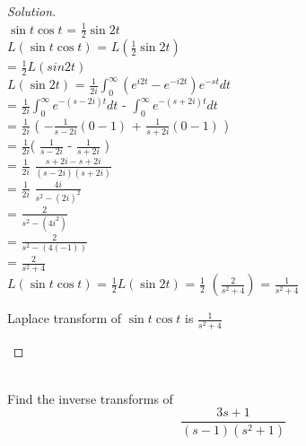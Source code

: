 \documentclass[12pt]{article}
\newenvironment{problem}[2][Problem]{\begin{trivlist}
\item[\hskip \labelsep {\bfseries #1}\hskip \labelsep {\bfseries #2.}]}{\end{trivlist}}
\begin{document}
\begin{proof}[Solution]
\text{ }\\
$\sin{t} \cos{t} $ = $\frac{1}{2} \sin{2t} $ \\

$L(\sin{t} \cos{t})$  =  $L(\frac{1}{2} \sin{2t} )$ \\

                          = $\frac{1}{2} L(sin{2t}) $ \\
                          
$L(\sin{2t})$  =  $\frac{1}{2i}\int_{0}^{\infty} (e^{i2t} - e^{-i2t}) e^{-st} dt $  \\

                   =  $\frac{1}{2i}\int_{0}^{\infty} e^{-(s-2i)t} dt$  -  $\int_{0}^{\infty} e^{-(s+2i)t} dt$  \\
                   
                   = $\frac{1}{2i}$ ( $-\frac{1}{s-2i}  (0-1)$  +  $\frac{1}{s+2i} (0-1) $ ) \\
                   
                   =  $\frac{1}{2i}$( $\frac{1}{s-2i}$ - $\frac{1}{s+2i}$ )\\
                   
                   = $\frac{1}{2i}$ $\frac{s+2i-s+2i}{(s-2i)(s+2i)}$  \\
                   
                   = $\frac{1}{2i}$  $\frac{4i}{s^2 - (2i)^2}$ \\
                   
                   = $\frac{2}{s^2 -(4 i^2)}$ \\
                   
                   = $\frac{2}{s^2 - (4(-1))}$ \\
                   
                   = $\frac{2}{s^2 + 4}$ \\
                   
$L(\sin{t} \cos{t})$ =  $\frac{1}{2} L(\sin{2t})$  = $\frac{1}{2}$ $(\frac{2}{s^2+4})$  =  $\frac{1}{s^2+4}$ \\

\begin{Large}
Laplace transform of $\sin{t} \cos{t} $  is  $\frac{1}{s^2+4}$ 
\end{Large}
\end{proof}

\begin{problem}{5}
\text{ }\\
Find the inverse transforms of\\
  $$\frac{3s+1}{(s-1)(s^2+1)}$$
\end{problem}
 
\end{document}
